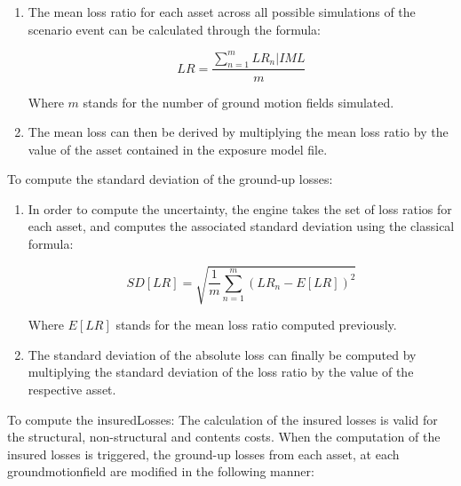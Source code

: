 \begin{enumerate}
\begin{itemize}
\item Uncorrelated: the term $\epsilon$ is always randomly sampled for each \gls{asset} and therefore the correlation between the vulnerability of the \glspl{asset} is ignored.

\end{itemize}

\item The mean loss ratio for each \gls{asset} across all possible simulations of the scenario event can be calculated through the formula:

\begin{equation}
LR=\frac{\sum^m_{n=1}LR_n|IML}{m}
\end{equation}

Where $m$ stands for the number of ground motion fields simulated.

\item The mean loss can then be derived by multiplying the mean loss ratio by the value of the \gls{asset} contained in the \gls{exposure model} file.

\end{enumerate}

To compute the standard deviation of the ground-up losses:

\begin{enumerate}

\item In order to compute the uncertainty, the engine takes the set of loss ratios for each \gls{asset}, and computes the associated standard deviation using the classical formula:

\begin{equation}
SD[LR]=\sqrt{  \frac{1}{m}\sum_{n=1}^m{(LR_n-E[LR])^2} }
\end{equation}

Where $E[LR]$ stands for the mean loss ratio computed previously.

\item The standard deviation of the absolute loss can finally be computed by multiplying the standard deviation of the loss ratio by the value of the respective \gls{asset}.

\end{enumerate}

To compute the \gls{insuredLosses}:
The calculation of the insured losses is valid for the structural, non-structural and contents costs. When the computation of the insured losses is triggered, the ground-up losses from each asset, at each \gls{groundmotionfield} are modified in the following manner:

